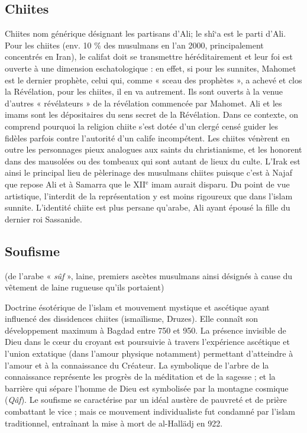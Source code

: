 \subsection{Chiites}
Chiites nom générique désignant les partisans
d’Ali; le shî\textquoteleft a est le parti d’Ali.
Pour les chiites (env. 10 \% des musulmans
en l’an 2000, principalement concentrés en
Iran), le califat doit se transmettre héréditairement
et leur foi est ouverte à une
dimension eschatologique : en effet, si
pour les sunnites, Mahomet est le dernier
prophète, celui qui, comme « sceau des
prophètes », a achevé et clos la Révélation,
pour les chiites, il en va autrement.
Ils sont ouverts à la venue d’autres « révélateurs »
de la révélation commencée par
Mahomet. Ali et les imams sont les dépositaires
du sens secret de la Révélation.
Dans ce contexte, on comprend pourquoi
la religion chiite s’est dotée d’un clergé
censé guider les fidèles parfois contre
l'autorité d’un calife incompétent. Les
chiites vénèrent en outre les personnages
pieux analogues aux saints du christianisme,
et les honorent dans des mausolées
ou des tombeaux qui sont autant de lieux
du culte. L’Irak est ainsi le principal lieu
de pèlerinage des musulmans chiites
puisque c’est à Najaf que repose Ali et à
Samarra que le XII$^\text{e}$ imam aurait disparu.
Du point de vue artistique, l’interdit de la
représentation y est moins rigoureux que
dans l'islam sunnite. L'identité chiite est
plus persane qu’arabe, Ali ayant épousé
la fille du dernier roi Sassanide.


  
\subsection{Soufisme}
 (de l’arabe « {\it sûf} », laine, premiers
 ascètes musulmans ainsi désignés à
cause du vêtement de laine rugueuse
qu'ils portaient)

Doctrine ésotérique de
l'islam et mouvement mystique et ascétique
ayant influencé des dissidences
chiites (ismaïlisme, Druzes). Elle connaît
son développement maximum à Bagdad
entre 750 et 950. La présence invisible de
Dieu dans le cœur du croyant est poursuivie
à travers l’expérience ascétique et
l'union extatique (dans l’amour physique
notamment) permettant d’atteindre à
l'amour et à la connaissance du Créateur.
La symbolique de l’arbre de la connaissance
représente les progrès de la méditation
et de la sagesse ; et la barrière qui
sépare l’homme de Dieu est symbolisée
par la montagne cosmique ({\it Qâf}). Le soufisme
se caractérise par un idéal austère
de pauvreté et de prière combattant le
vice ; mais ce mouvement individualiste
fut condamné par l'islam traditionnel,
entraînant la mise à mort de al-Hallädj en
922.

